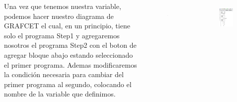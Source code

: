 \begin{frame}
	\begin{columns}
		Una vez que tenemos nuestra variable, podemos hacer nuestro diagrama de GRAFCET el cual, en un principio, tiene solo el programa Step1 y agregaremos nosotros el programa Step2 con el boton de agregar bloque abajo estando seleccionado el primer programa. Ademas modificaremos la condición necesaria para cambiar del primer programa al segundo, colocando el nombre de la variable que definimos.

		\begin{figure}
			\begin{center}
				\includegraphics[width=0.4\textwidth]{images/00-control-multiple/03-03.png}
				\label{fig:multiple-03-03}
			\end{center}
		\end{figure}
		\begin{figure}
			\begin{center}
				\includegraphics[width=0.9\textwidth]{images/00-control-multiple/03-04.png}
				\label{fig:multiple-03-04}
			\end{center}
		\end{figure}
	\end{columns}
\end{frame}

